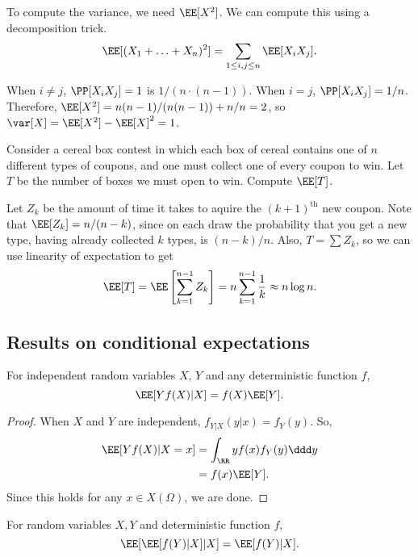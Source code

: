 To compute the variance, we need $\EE[X^2]$. We can compute this using a decomposition trick.
\begin{align*}
    \EE[(X_1 + \hdots + X_n)^2] = \sum_{1\leq i,j\leq n}\EE[X_iX_j]. 
\end{align*}

When $i\neq j$, $\PP[X_iX_j]=1$ is $1/(n\cdot (n-1))$. When $i=j$, $\PP[X_iX_j] = 1/n$. Therefore, $\EE[X^2] = n(n-1)/(n(n-1)) + n/n = 2$, so $\var[X] = \EE[X^2] - \EE[X]^2 = 1$.

\begin{example}

Consider a cereal box contest in which each box of cereal contains one of $n$ different types of coupons, and one must collect one of every coupon to win. Let $T$ be the number of boxes we must open to win. Compute $\EE[T]$. 
\end{example}

Let $Z_k$ be the amount of time it takes to aquire the $(k+1)^{\text{th}}$ new coupon. 
Note that $\EE[Z_k] = n/(n-k)$, since on each draw the probability that you get a new type, having already collected $k$ types, is $(n-k)/n$. Also, $T = \sum Z_k$, so we can use linearity of expectation to get
\[\EE[T] = \EE\left[\sum_{k=1}^{n-1}Z_k\right] = n\sum_{k=1}^{n-1}\frac{1}{k}\approx n\log n.\]

\subsection{Results on conditional expectations}

\begin{theorem}
\lemlabel

For independent random variables $X$, $Y$ and any deterministic function $f$, 
\[\EE[Yf(X)\vert X] = f(X)\EE[Y].\]
\end{theorem}

\begin{proof}
When $X$ and $Y$ are independent, $f_{Y\vert X}(y\vert x) = f_Y(y)$. So, 
\begin{align*}
    \EE[Yf(X)\vert X=x] &= \int_{\RR}yf(x)f_{Y}(y)\ddd y \\
    &= f(x)\EE[Y]. 
\end{align*}
Since this holds for any $x\in X(\Omega)$, we are done.
\end{proof}

\begin{theorem}
\lemlabel

For random variables $X,Y$ and deterministic function $f$, 
\[\EE[\EE[f(Y)\vert X]\vert X] = \EE[f(Y)\vert X]. \]
\end{theorem}

